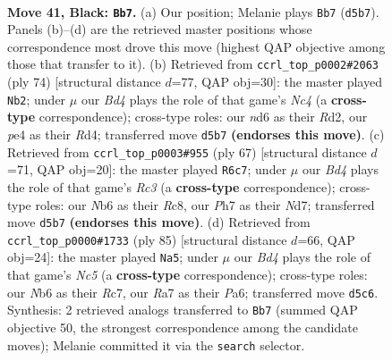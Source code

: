 \documentclass[11pt]{article}
\begin{document}
\clearpage

\begin{figure}[p]\centering
\begin{subfigure}{0.46\textwidth}\centering
\resizebox{\linewidth}{!}{%
\newchessgame
\chessboard[
  setfen={5k2/r4p1p/rn1N2p1/p2bp1P1/P3P3/1P4RP/4K1P1/RN6 b - - 0 41},
  showmover=false,
  pgfstyle=straightmove, color=movearrow, markmove={d5-b7}
]}
\caption{}
\end{subfigure}\hfill
\begin{subfigure}{0.46\textwidth}\centering
\resizebox{\linewidth}{!}{%
\newchessgame
\chessboard[
  setfen={7r/4kp2/2p3p1/p1rnP3/PpNR3p/1P6/2PR2PP/2K5 w - - 0 38},
  showmover=false,
  pgfstyle=straightmove, color=movearrow, markmove={c4-b2}
]}
\caption{}
\end{subfigure}
\\[4pt]
\begin{subfigure}{0.46\textwidth}\centering
\resizebox{\linewidth}{!}{%
\newchessgame
\chessboard[
  setfen={2r5/3nkpp1/p1r1p3/4P2p/1R1N1P1P/2P2RP1/1KP5/8 b - - 3 34},
  showmover=false,
  pgfstyle=straightmove, color=movearrow, markmove={c6-c7}
]}
\caption{}
\end{subfigure}\hfill
\begin{subfigure}{0.46\textwidth}\centering
\resizebox{\linewidth}{!}{%
\newchessgame
\chessboard[
  setfen={6k1/2r2pp1/pr2b2p/3pP3/1pnN1RP1/1P5P/P1P3B1/2K1R3 b - - 0 43},
  showmover=false,
  pgfstyle=straightmove, color=movearrow, markmove={c4-a5}
]}
\caption{}
\end{subfigure}
\caption{\textbf{Move 41, Black: \texttt{Bb7}.} (a) Our position; Melanie plays \texttt{Bb7} (\texttt{d5b7}). Panels (b)--(d) are the retrieved master positions whose correspondence most drove this move (highest QAP objective among those that transfer to it). (b) Retrieved from \texttt{ccrl\_top\_p0002\#2063} (ply 74) [structural distance $d$=77, QAP obj=30]: the master played \texttt{Nb2}; under $\mu$ our \emph{Bd4} plays the role of that game's \emph{Nc4} (a \textbf{cross-type} correspondence); cross-type roles: our \emph{n}d6 as their \emph{R}d2, our \emph{p}e4 as their \emph{R}d4; transferred move \texttt{d5b7} \textbf{(endorses this move)}. (c) Retrieved from \texttt{ccrl\_top\_p0003\#955} (ply 67) [structural distance $d$=71, QAP obj=20]: the master played \texttt{R6c7}; under $\mu$ our \emph{Bd4} plays the role of that game's \emph{Rc3} (a \textbf{cross-type} correspondence); cross-type roles: our \emph{N}b6 as their \emph{R}c8, our \emph{P}h7 as their \emph{N}d7; transferred move \texttt{d5b7} \textbf{(endorses this move)}. (d) Retrieved from \texttt{ccrl\_top\_p0000\#1733} (ply 85) [structural distance $d$=66, QAP obj=24]: the master played \texttt{Na5}; under $\mu$ our \emph{Bd4} plays the role of that game's \emph{Nc5} (a \textbf{cross-type} correspondence); cross-type roles: our \emph{N}b6 as their \emph{R}c7, our \emph{R}a7 as their \emph{P}a6; transferred move \texttt{d5c6}. Synthesis: 2 retrieved analogs transferred to \texttt{Bb7} (summed QAP objective 50, the strongest correspondence among the candidate moves); Melanie committed it via the \texttt{search} selector.}
\label{fig:thought-m81}
\end{figure}
\end{document}
